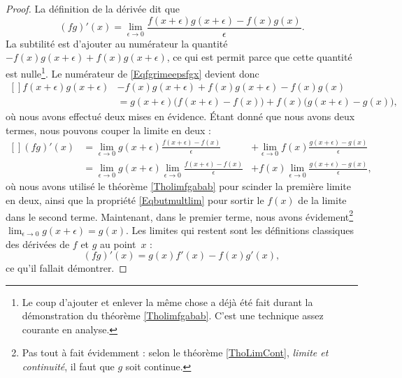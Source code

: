 \begin{proof}
La définition de la dérivée dit que
\begin{equation}        \label{Eqfgrimeepsfgx}
    (fg)'(x)=\lim_{\epsilon\to 0}\frac{f(x+\epsilon)g(x+\epsilon)-f(x)g(x)}{\epsilon}.
\end{equation}
La subtilité est d'ajouter au numérateur la quantité $-f(x)g(x+\epsilon)+f(x)g(x+\epsilon)$, ce qui est permit parce que cette quantité est nulle\footnote{Le coup d'ajouter et enlever la même chose a déjà été fait durant la démonstration du théorème \ref{Tholimfgabab}. C'est une technique assez courante en analyse.}. Le numérateur de \eqref{Eqfgrimeepsfgx} devient donc
\begin{equation}
    \begin{aligned}[]
f(x+\epsilon)g(x+\epsilon)&-f(x)g(x+\epsilon)+f(x)g(x+\epsilon)-f(x)g(x) \\
            &= g(x+\epsilon)\big( f(x+\epsilon)-f(x) \big)+f(x)\big( g(x+\epsilon)-g(x) \big),
    \end{aligned}
\end{equation}
où nous avons effectué deux mises en évidence. Étant donné que nous avons deux termes, nous pouvons couper la limite en deux :
\begin{equation}
    \begin{aligned}[]
        (fg)'(x)    &=\lim_{\epsilon\to 0}g(x+\epsilon)\frac{ f(x+\epsilon)-f(x) }{\epsilon}            &+\lim_{\epsilon\to 0}f(x)\frac{ g(x+\epsilon)-g(x) }{\epsilon}\\
                &=\lim_{\epsilon\to 0}g(x+\epsilon)\lim_{\epsilon\to 0}\frac{ f(x+\epsilon)-f(x) }{\epsilon}    &+f(x)\lim_{\epsilon\to 0}\frac{ g(x+\epsilon)-g(x) }{\epsilon},
    \end{aligned}
\end{equation}
où nous avons utilisé le théorème \ref{Tholimfgabab} pour scinder la première limite en deux, ainsi que la propriété \eqref{Eqbutmultlim} pour sortir le $f(x)$ de la limite dans le second terme. Maintenant, dans le premier terme, nous avons évidement\footnote{Pas tout à fait évidemment : selon le théorème \ref{ThoLimCont}, \emph{limite et continuité}, il faut que $g$ soit continue.} $\lim_{\epsilon\to 0}g(x+\epsilon)=g(x)$. Les limites qui restent sont les définitions classiques des dérivées de $f$ et $g$ au point~$x$ :
\begin{equation}
    (fg)'(x)=g(x)f'(x)-f(x)g'(x),
\end{equation}
ce qu'il fallait démontrer.
\end{proof}

